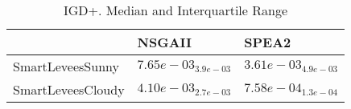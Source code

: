 \documentclass{article}
\begin{document}
\begin{table}
\caption{IGD+. Median and Interquartile Range}
\label{table: IGD+}
\centering
\begin{scriptsize}
\begin{tabular}{lll}
\hline & NSGAII &  SPEA2\\
\hline 
SmartLeveesSunny & \cellcolor{gray25}$  7.65e-03_{ 3.9e-03}$ & \cellcolor{gray95}$  3.61e-03_{ 4.9e-03}$ \\
SmartLeveesCloudy & \cellcolor{gray25}$  4.10e-03_{ 2.7e-03}$ & \cellcolor{gray95}$  7.58e-04_{ 1.3e-04}$ \\
\hline
\end{tabular}
\end{scriptsize}
\end{table}
\end{document}
